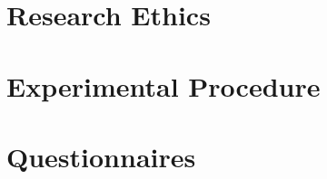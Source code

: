 \begin{appendices}

\chapter{Research Ethics}


\chapter{Experimental Procedure}

\chapter{Questionnaires}
\label{ap:questionnaires}



\label{ap:ueq}


\end{appendices}


